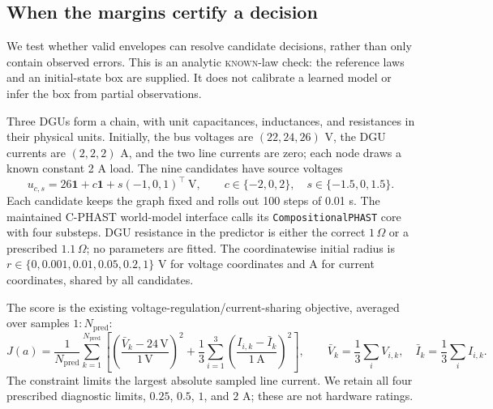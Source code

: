 \subsection{When the margins certify a decision}
\label{app:certificate-validation}

We test whether valid envelopes can resolve candidate decisions, rather than
only contain observed errors. This is an analytic \textsc{known}-law check:
the reference laws and an initial-state box are supplied. It does not
calibrate a learned model or infer the box from partial observations.

Three DGUs form a chain, with unit capacitances, inductances, and resistances
in their physical units. Initially, the bus voltages are $(22,24,26)$ V,
the DGU currents are $(2,2,2)$ A, and the two line currents are zero; each
node draws a known constant 2 A load. The nine candidates have source
voltages
\[
 u_{c,s}=26\mathbf 1+c\mathbf 1+s(-1,0,1)^\top\ \mathrm V,
 \qquad c\in\{-2,0,2\},\quad s\in\{-1.5,0,1.5\}.
\]
Each candidate keeps the graph fixed and rolls out 100 steps of 0.01 s.
The maintained C-PHAST world-model interface calls its
\texttt{CompositionalPHAST} core with four substeps. DGU resistance in the
predictor is either the correct $1\,\Omega$ or a prescribed
$1.1\,\Omega$; no parameters are fitted. The coordinatewise initial radius
is $r\in\{0,0.001,0.01,0.05,0.2,1\}$ V for voltage coordinates and A for
current coordinates, shared by all candidates.

The score is the existing voltage-regulation/current-sharing objective,
averaged over samples $1{:}{N_{\mathrm{pred}}}$:
\[
 J(a)=\frac1{N_{\mathrm{pred}}}\sum_{k=1}^{{N_{\mathrm{pred}}}}\left[
 \left(\frac{\bar V_k-24\,\mathrm V}{1\,\mathrm V}\right)^2+
 \frac13\sum_{i=1}^3
 \left(\frac{I_{i,k}-\bar I_k}{1\,\mathrm A}\right)^2\right],
 \qquad \bar V_k=\frac13\sum_i V_{i,k},\quad
 \bar I_k=\frac13\sum_i I_{i,k}.
\]
The constraint limits the largest absolute sampled line current. We retain
all four prescribed diagnostic limits, $0.25$, $0.5$, $1$, and $2$ A;
these are not hardware ratings.

